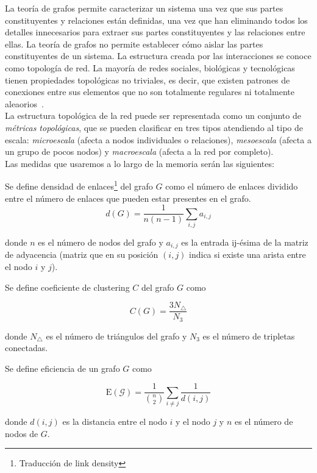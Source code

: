 La teoría de grafos permite caracterizar un sistema una vez que sus partes constituyentes y relaciones están definidas, una vez que han eliminando todos los detalles innecesarios para extraer sus partes constituyentes y las relaciones entre ellas. La teoría de grafos no permite establecer cómo aislar las partes constituyentes de un sistema. La estructura creada por las interacciones se conoce como topología de red. La mayoría de redes sociales, biológicas y tecnológicas tienen propiedades topológicas no triviales, es decir, que existen patrones de conexiones entre sus elementos que no son totalmente regulares ni totalmente aleaorios~\cite{Zanin2012}.\\
La estructura topológica de la red puede ser representada como un conjunto de \textit{métricas topológicas}, que se pueden clasificar en tres tipos atendiendo al tipo de escala: \textit{microescala} (afecta a nodos individuales o relaciones), \textit{mesoescala} (afecta a un grupo de pocos nodos) y \textit{macroescala} (afecta a la red por completo).\\

Las medidas que usaremos a lo largo de la memoria serán las siguientes:

\begin{defi}
	Se define densidad de enlaces\footnote{Traducción de link density} del grafo $G$ como el número de enlaces dividido entre el número de enlaces que pueden estar presentes en el grafo.
	\begin{equation}\label{eq:densidad}
	d(G) = \dfrac{1}{n(n-1)} \sum_{i,j} a_{i,j}
	\end{equation}
	
	donde $n$ es el número de nodos del grafo y $a_{i,j}$ es la entrada ij-ésima de la matriz de adyacencia (matriz que en su posición $(i,j)$ indica si existe una arista entre el nodo $i$ y $j$).
\end{defi}

\begin{defi}
	Se define coeficiente de clustering $C$ del grafo $G$ como
	
	\begin{equation}\label{eq:clustering}
	C(G) = \dfrac{3N_{\triangle}}{N_3}
	\end{equation}
	
	donde $N_{\triangle}$ es el número de triángulos del grafo y $N_3$ es el número de tripletas conectadas.
\end{defi}

\begin{defi}
	Se define eficiencia de un grafo $G$ como
	
	\begin{equation}\label{eq:eficiencia}
	\mathrm{E}(\mathcal{G}) = \dfrac{1}{\binom{n}{2}} \sum_{i\neq j} \dfrac{1}{d(i,j)}
	\end{equation}
	
	donde $d(i,j)$ es la distancia entre el nodo $i$ y el nodo $j$ y $n$ es el número de nodos de $G$.
\end{defi}


